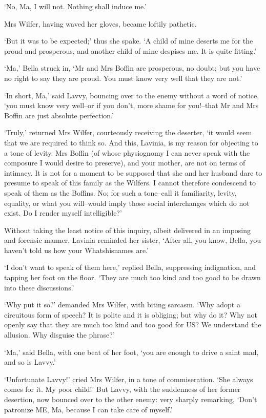 ‘No, Ma, I will not. Nothing shall induce me.’

Mrs Wilfer, having waved her gloves, became loftily pathetic.

‘But it was to be expected;’ thus she spake. ‘A child of mine deserts me
for the proud and prosperous, and another child of mine despises me. It
is quite fitting.’

‘Ma,’ Bella struck in, ‘Mr and Mrs Boffin are prosperous, no doubt; but
you have no right to say they are proud. You must know very well that
they are not.’

‘In short, Ma,’ said Lavvy, bouncing over to the enemy without a word
of notice, ‘you must know very well--or if you don’t, more shame for
you!--that Mr and Mrs Boffin are just absolute perfection.’

‘Truly,’ returned Mrs Wilfer, courteously receiving the deserter, ‘it
would seem that we are required to think so. And this, Lavinia, is
my reason for objecting to a tone of levity. Mrs Boffin (of whose
physiognomy I can never speak with the composure I would desire to
preserve), and your mother, are not on terms of intimacy. It is not
for a moment to be supposed that she and her husband dare to presume to
speak of this family as the Wilfers. I cannot therefore condescend to
speak of them as the Boffins. No; for such a tone--call it familiarity,
levity, equality, or what you will--would imply those social
interchanges which do not exist. Do I render myself intelligible?’

Without taking the least notice of this inquiry, albeit delivered in an
imposing and forensic manner, Lavinia reminded her sister, ‘After all,
you know, Bella, you haven’t told us how your Whatshisnames are.’

‘I don’t want to speak of them here,’ replied Bella, suppressing
indignation, and tapping her foot on the floor. ‘They are much too kind
and too good to be drawn into these discussions.’

‘Why put it so?’ demanded Mrs Wilfer, with biting sarcasm. ‘Why adopt a
circuitous form of speech? It is polite and it is obliging; but why do
it? Why not openly say that they are much too kind and too good for US?
We understand the allusion. Why disguise the phrase?’

‘Ma,’ said Bella, with one beat of her foot, ‘you are enough to drive a
saint mad, and so is Lavvy.’

‘Unfortunate Lavvy!’ cried Mrs Wilfer, in a tone of commiseration. ‘She
always comes for it. My poor child!’ But Lavvy, with the suddenness of
her former desertion, now bounced over to the other enemy: very sharply
remarking, ‘Don’t patronize ME, Ma, because I can take care of myself.’

